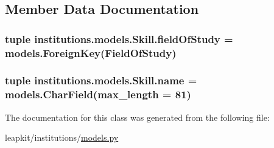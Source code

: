 \subsection{Member Data Documentation}
\hypertarget{classinstitutions_1_1models_1_1_skill_af2b4c3564ab52b2a788f5bf1c03f5c10}{
\subsubsection[{field\-Of\-Study}]{\setlength{\rightskip}{0pt plus 5cm}tuple institutions.\-models.\-Skill.\-field\-Of\-Study = models.\-Foreign\-Key({\bf Field\-Of\-Study})\hspace{0.3cm}{\ttfamily [static]}}}\label{classinstitutions_1_1models_1_1_skill_af2b4c3564ab52b2a788f5bf1c03f5c10}
\hypertarget{classinstitutions_1_1models_1_1_skill_a3bc150c6eed26bd098ddc31d631c084d}{
\subsubsection[{name}]{\setlength{\rightskip}{0pt plus 5cm}tuple institutions.\-models.\-Skill.\-name = models.\-Char\-Field(max\-\_\-length = 81)\hspace{0.3cm}{\ttfamily [static]}}}\label{classinstitutions_1_1models_1_1_skill_a3bc150c6eed26bd098ddc31d631c084d}


The documentation for this class was generated from the following file\-:\begin{DoxyCompactItemize}
\item 
leapkit/institutions/\hyperlink{institutions_2models_8py}{models.\-py}\end{DoxyCompactItemize}
